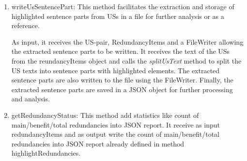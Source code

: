 \begin{enumerate}
	\item writeUsSentencePart: This method facilitates the extraction and storage of highlighted sentence parts from USs in a file for further analysis or as a reference.
	
	As input, it receives the US-pair, RedundancyItems and a FileWriter allowing the extracted sentence parts to be written. It receives the text of the USs from the reundancyItems object and calls the \textit{splitUsText} method to split the US texts into sentence parts with highlighted elements. The extracted sentence parts are also written to the file using the FileWriter. Finally, the extracted sentence parts are saved in a JSON object for further processing and analysis.
	
	
	\item getRedundancyStatus: This method add statistics like count of main/benefit/total redundancies into JSON report. It receive as input redundancyItems and as output write the count of main/benefit/total redundancies into JSON report already defined in method highlightRedundancies.
	

	
\end{enumerate}
